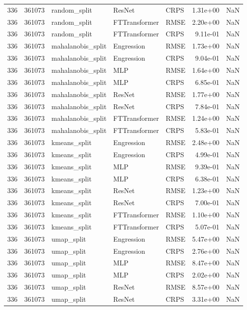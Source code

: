 \begin{tabular}{rrlllrr}
336 & 361073 & random\_split & ResNet & CRPS & 1.31e+00 & NaN \\
336 & 361073 & random\_split & FTTransformer & RMSE & 2.20e+00 & NaN \\
336 & 361073 & random\_split & FTTransformer & CRPS & 9.11e-01 & NaN \\
336 & 361073 & mahalanobis\_split & Engression & RMSE & 1.73e+00 & NaN \\
336 & 361073 & mahalanobis\_split & Engression & CRPS & 9.04e-01 & NaN \\
336 & 361073 & mahalanobis\_split & MLP & RMSE & 1.64e+00 & NaN \\
336 & 361073 & mahalanobis\_split & MLP & CRPS & 6.85e-01 & NaN \\
336 & 361073 & mahalanobis\_split & ResNet & RMSE & 1.77e+00 & NaN \\
336 & 361073 & mahalanobis\_split & ResNet & CRPS & 7.84e-01 & NaN \\
336 & 361073 & mahalanobis\_split & FTTransformer & RMSE & 1.24e+00 & NaN \\
336 & 361073 & mahalanobis\_split & FTTransformer & CRPS & 5.83e-01 & NaN \\
336 & 361073 & kmeans\_split & Engression & RMSE & 2.48e+00 & NaN \\
336 & 361073 & kmeans\_split & Engression & CRPS & 4.99e-01 & NaN \\
336 & 361073 & kmeans\_split & MLP & RMSE & 9.39e-01 & NaN \\
336 & 361073 & kmeans\_split & MLP & CRPS & 6.38e-01 & NaN \\
336 & 361073 & kmeans\_split & ResNet & RMSE & 1.23e+00 & NaN \\
336 & 361073 & kmeans\_split & ResNet & CRPS & 7.00e-01 & NaN \\
336 & 361073 & kmeans\_split & FTTransformer & RMSE & 1.10e+00 & NaN \\
336 & 361073 & kmeans\_split & FTTransformer & CRPS & 5.07e-01 & NaN \\
336 & 361073 & umap\_split & Engression & RMSE & 5.47e+00 & NaN \\
336 & 361073 & umap\_split & Engression & CRPS & 2.76e+00 & NaN \\
336 & 361073 & umap\_split & MLP & RMSE & 8.47e+00 & NaN \\
336 & 361073 & umap\_split & MLP & CRPS & 2.02e+00 & NaN \\
336 & 361073 & umap\_split & ResNet & RMSE & 8.57e+00 & NaN \\
336 & 361073 & umap\_split & ResNet & CRPS & 3.31e+00 & NaN \\

\end{tabular}
